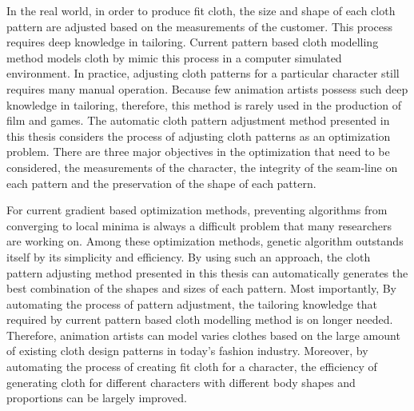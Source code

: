 In the real world, in order to produce fit cloth, the size and shape of each cloth pattern are adjusted based on the measurements of the customer. This process requires deep knowledge in tailoring. Current pattern based cloth modelling method models cloth by mimic this process in a computer simulated environment. In practice, adjusting cloth patterns for a particular character still requires many manual operation. Because few animation artists possess such deep knowledge in tailoring, therefore, this method is rarely used in the production of film and games. The automatic cloth pattern adjustment method presented in this thesis considers the process of adjusting cloth patterns as an optimization problem. There are three major objectives in the optimization that need to be considered, the measurements of the character, the integrity of the seam-line on each pattern and the preservation of the shape of each pattern. 

For current gradient based optimization methods, preventing algorithms from converging to local minima is always a difficult problem that many researchers are working on. Among these optimization methods, genetic algorithm outstands itself by its simplicity and efficiency. By using such an approach, the cloth pattern adjusting method presented in this thesis can automatically generates the best combination of the shapes and sizes of each pattern. Most importantly, By automating the process of pattern adjustment, the tailoring knowledge that required by current pattern based cloth modelling method is on longer needed. Therefore, animation artists can model varies clothes based on the large amount of existing cloth design patterns in today's fashion industry. Moreover, by automating the process of creating fit cloth for a character, the efficiency of generating cloth for different characters with different body shapes and proportions can be largely improved. 







